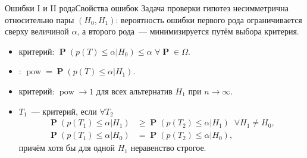 \documentclass[11pt,pdf,utf8,hyperref={unicode},aspectratio=169]{beamer}
\DeclareMathOperator{\prob}{\mathbf{P}}
\DeclareMathOperator{\pow}{pow}
\begin{document}
\begin{frame}{Ошибки I и II рода}{Свойства ошибок}
%
%
	Задача проверки гипотез несимметрична относительно пары $\left(H_0,H_1\right)$: вероятность ошибки первого рода ограничивается сверху величиной $\alpha$, а второго рода~--- минимизируется путём выбора критерия.

	\bigskip
    \begin{itemize}
	\item {} критерий: $\prob\left(p\left(T\right)\leqslant\alpha\left|H_0\right.\right)\leqslant  \alpha$ $\forall \prob \in \Omega$.

	\item {}: $\pow = \prob\left(p\left(T\right)\leqslant\alpha\left|H_1\right.\right).$

    \item {} критерий: $\pow \rightarrow 1 $ для всех альтернатив $H_1$ при $n\rightarrow \infty$.

    \item $T_1$~---  критерий, если $\forall T_2$
	\begin{align*}
	\prob\left(p\left(T_1\right)\leqslant  \alpha\left|H_1\right.\right) & \geqslant  \prob\left(p\left(T_2\right)\leqslant  \alpha\left|H_1\right.\right) \;\; \forall H_1\neq H_0, \\
	\prob\left(p\left(T_1\right)\leqslant  \alpha\left|H_0\right.\right) & = \prob\left(p\left(T_2\right)\leqslant  \alpha\left|H_0\right.\right),
	\end{align*}
	причём хотя бы для одной $H_1$ неравенство строгое.
    \end{itemize}
\end{frame}
\end{document}
